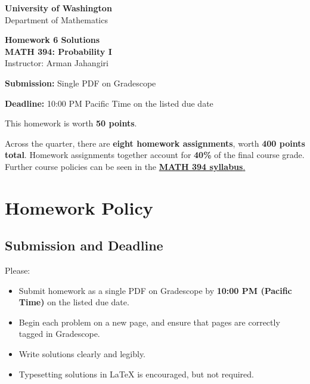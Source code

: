 \documentclass[11pt]{article}
\newcommand{\course}{MATH 394: Probability I}
\newcommand{\department}{Department of Mathematics}
\newcommand{\university}{University of Washington}
\begin{document}
\begin{titlepage}
\centering
\vspace*{1.2cm}

{\Large \textbf{\university}}\\
{\large \department}

\vspace{1.5cm}

{\Huge \color{uwpurple}\textbf{Homework 6 Solutions}}\\[0.25cm]
{\Large \textbf{\course}}\\[0.25cm]
{\large Instructor: Arman Jahangiri}

\vspace{1cm}

\begin{tcolorbox}[width=0.78\textwidth,colback=softpurple,colframe=uwpurple,boxrule=0.9pt,arc=3mm]
\centering
\textbf{Submission:} Single PDF on Gradescope

\textbf{Deadline:} 10:00 PM Pacific Time on the listed due date
\end{tcolorbox}

\vspace{0.8cm}

\begin{tcolorbox}[width=0.86\textwidth,colback=white,colframe=uwgold,boxrule=0.8pt,arc=3mm]
This homework is worth \textbf{50 points}.

Across the quarter, there are \textbf{eight homework assignments}, worth \textbf{400 points total}. Homework assignments together account for \textbf{40\%} of the final course grade. Further course policies can be seen in the \href{https://armanjg.github.io/MATH-394-Probability-1-v2/}{\textbf{MATH 394 syllabus}.}
\end{tcolorbox}

\vfill
\end{titlepage}

\section*{Homework Policy}

\subsection*{Submission and Deadline}

Please:

\begin{itemize}[leftmargin=*]
    \item Submit homework as a single PDF on Gradescope by \textbf{10:00 PM (Pacific Time)} on the listed due date.
    \item Begin each problem on a new page, and ensure that pages are correctly tagged in Gradescope.
    \item Write solutions clearly and legibly.
    \item Typesetting solutions in LaTeX is encouraged, but not required.
\end{itemize}
\end{document}

